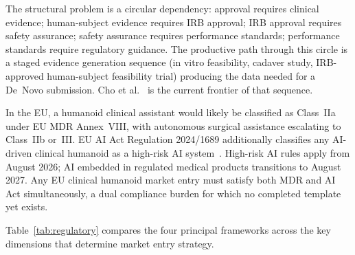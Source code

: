 \documentclass[acmsmall]{acmart}
\begin{document}
The structural problem is a circular dependency: approval requires clinical
evidence; human-subject evidence requires IRB approval; IRB approval requires
safety assurance; safety assurance requires performance standards; performance
standards require regulatory guidance. The productive path through this circle is
a staged evidence generation sequence (in vitro feasibility, cadaver study,
IRB-approved human-subject feasibility trial) producing the data needed for a
De~Novo submission. Cho et al.~\cite{cho2026humanoid} is the current frontier of
that sequence.

In the EU, a humanoid clinical assistant would likely be classified as Class~IIa
under EU MDR Annex~VIII, with autonomous surgical assistance escalating to
Class~IIb or~III. EU AI Act Regulation 2024/1689 additionally classifies any
AI-driven clinical humanoid as a high-risk AI system~\cite{solaiman2024regulating}. High-risk AI rules apply
from August 2026; AI embedded in regulated medical products transitions to August
2027. Any EU clinical humanoid market entry must satisfy both MDR and AI Act
simultaneously, a dual compliance burden for which no completed template yet
exists.

Table~\ref{tab:regulatory} compares the four principal frameworks across the key
dimensions that determine market entry strategy.
\end{document}
